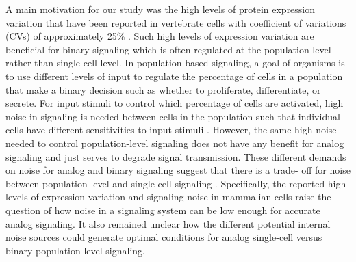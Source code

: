 A main motivation for our study was the high levels of protein expression variation that have been reported in vertebrate cells with coefficient of variations (CVs) of approximately 25\% \cite{Sigal2006, Spencer2009, Gaudet2012}. Such high levels of expression variation are beneficial for binary signaling which is often regulated at the population level rather than single-cell level. In population-based signaling, a goal of organisms is to use different levels of input to regulate the percentage of cells in a population that make a binary decision such as whether to proliferate, differentiate, or secrete. For input stimuli to control which percentage of cells are activated, high noise in signaling is needed between cells in the population such that individual cells have different sensitivities to input stimuli \cite{Suel2007,Raj2008,Kalmar2009,Eldar2010,Ahrends2014}. However, the same high noise needed to control population-level signaling does not have any benefit for analog signaling and just serves to degrade signal transmission. These different demands on noise for analog and binary signaling suggest that there is a trade- off for noise between population-level and single-cell signaling \cite{Suderman2017}. Specifically, the reported high levels of expression variation and signaling noise in mammalian cells \cite{Sigal2006,Cheong2011,Gaudet2012,Selimkhanov2014} raise the question of how noise in a signaling system can be low enough for accurate analog signaling. It also remained unclear how the different potential internal noise sources could generate optimal conditions for analog single-cell versus binary population-level signaling. 


